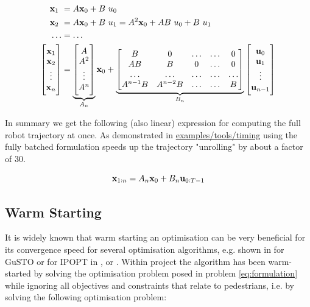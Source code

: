 \begin{align}
\x_1 &= A \x_0 + B \ u_0 \\
\x_2 &= A \x_0 + B \ u_1 = A^2 \x_0 + A B \ u_0 + B \ u_1\\ 
\hdots &= \hdots \\
\begin{bmatrix} \x_1 \\ \x_2 \\ \vdots \\ \x_n \end{bmatrix} &= \underbrace{\begin{bmatrix} A \\ A^2 \\ \vdots \\ A^n \end{bmatrix}}_{\substack{A_n}} \x_0 + \underbrace{\begin{bmatrix} B & 0 & \hdots & \hdots & 0 \\ AB & B & 0 & \hdots & 0 \\ \hdots & \hdots & \hdots & \hdots & \hdots \\ A^{n-1} B & A^{n-2} B & \hdots & \hdots & B \end{bmatrix}}_{\substack{B_n}} \begin{bmatrix} \u_0 \\ \u_1 \\ \vdots \\ \u_{n-1} \end{bmatrix}
\end{align}

In summary we get the following (also linear) expression for computing the full robot trajectory at once. As demonstrated in \href{https://github.com/simon-schaefer/mantrap/blob/master/examples/tools/timing.ipynb}{examples/tools/timing} using the fully batched formulation speeds up the trajectory "unrolling" by about a factor of 30.  

\begin{equation}
\mathbf{x}_{1:n} = A_n \mathbf{x}_0 + B_n \mathbf{u}_{0:T-1}
\label{eq:dynamics_stacked}
\end{equation}

\subsection{Warm Starting}
\label{text:approach/runtime/warm_starting}
It is widely known that warm starting an optimisation can be very beneficial for its convergence speed for several optimisation algorithms, e.g. shown in \cite{Banerjee2020} for \ac{GuSTO} or for \ac{IPOPT} in \cite{Shahzad2010}, \cite{John2008} or \cite{Spielberge2019}.
\newline
Within project \project the algorithm has been warm-started by solving the optimisation problem posed in problem \ref{eq:formulation} while ignoring all objectives and constraints that relate to pedestrians, i.e. by solving the following optimisation problem: \\

